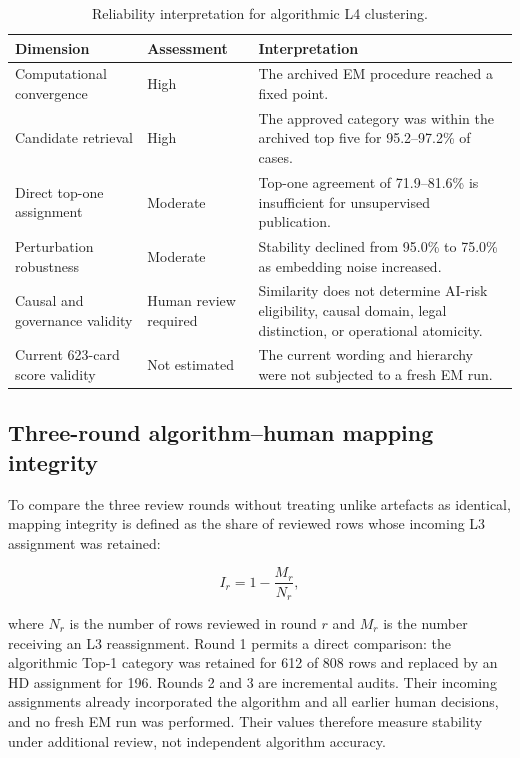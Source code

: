 \documentclass[10pt,a4paper]{article}
\begin{document}
\begin{table}[H]
\centering
\caption{Reliability interpretation for algorithmic L4 clustering.}
\label{tab:reliability}
\begin{tabular}{L{0.31\textwidth}L{0.16\textwidth}L{0.43\textwidth}}
\toprule
Dimension & Assessment & Interpretation \\
\midrule
Computational convergence & High & The archived EM procedure reached a fixed point. \\
Candidate retrieval & High & The approved category was within the archived top five for 95.2--97.2\% of cases. \\
Direct top-one assignment & Moderate & Top-one agreement of 71.9--81.6\% is insufficient for unsupervised publication. \\
Perturbation robustness & Moderate & Stability declined from 95.0\% to 75.0\% as embedding noise increased. \\
Causal and governance validity & Human review required & Similarity does not determine AI-risk eligibility, causal domain, legal distinction, or operational atomicity. \\
Current 623-card score validity & Not estimated & The current wording and hierarchy were not subjected to a fresh EM run. \\
\bottomrule
\end{tabular}
\end{table}

\subsection{Three-round algorithm--human mapping integrity}

To compare the three review rounds without treating unlike artefacts as identical, mapping integrity is defined as the share of reviewed rows whose incoming L3 assignment was retained:

\begin{equation}
I_r = 1 - \frac{M_r}{N_r},
\end{equation}

where $N_r$ is the number of rows reviewed in round $r$ and $M_r$ is the number receiving an L3 reassignment. Round 1 permits a direct comparison: the algorithmic Top-1 category was retained for 612 of 808 rows and replaced by an HD assignment for 196. Rounds 2 and 3 are incremental audits. Their incoming assignments already incorporated the algorithm and all earlier human decisions, and no fresh EM run was performed. Their values therefore measure stability under additional review, not independent algorithm accuracy.
\end{document}
